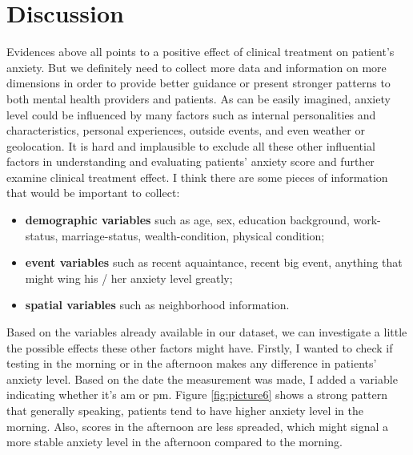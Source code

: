 \documentclass[11pt]{article}
\begin{document}
\section{Discussion}

Evidences above all points to a positive effect of clinical treatment on patient's anxiety. But we definitely need to collect more data and information on more dimensions in order to provide better guidance or present stronger patterns to both mental health providers and patients. As can be easily imagined, anxiety level could be influenced by many factors such as internal personalities and characteristics, personal experiences, outside events, and even weather or geolocation. It is hard and implausible to exclude all these other influential factors in understanding and evaluating patients' anxiety score and further examine clinical treatment effect. I think there are some pieces of information that would be important to collect: 

\begin{itemize}
	\item \textbf{demographic variables}  such as age, sex, education background, work-status, marriage-status, wealth-condition, physical condition;
	\item \textbf{event variables} such as recent aquaintance, recent big event, anything that might wing his / her anxiety level greatly;
	\item \textbf{spatial variables} such as neighborhood information.
\end{itemize}
	
Based on the variables already available in our dataset, we can investigate a little the possible effects these other factors might have. Firstly, I wanted to check if testing in the morning or in the afternoon makes any difference in patients' anxiety level. Based on the date the measurement was made, I added a variable indicating whether it's am or pm. Figure \ref{fig:picture6} shows a strong pattern that generally speaking, patients tend to have higher anxiety level in the morning. Also, scores in the afternoon are less spreaded, which might signal a more stable anxiety level in the afternoon compared to the morning.
\end{document}
